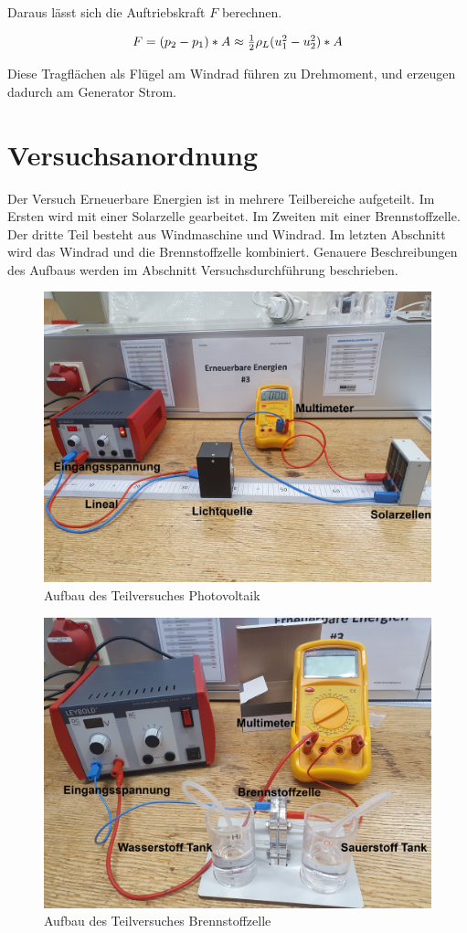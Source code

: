 \documentclass[12pt,a4paper,twoside]{article}
\begin{document}
\noindent
Daraus lässt sich die Auftriebskraft $F$ berechnen. 

\begin{equation}
    \label{eq:auftriebskraft}
    \centerline{$F = (p_2 - p_1) * A \approx \frac{1}{2} \rho_L (u_1^2 - u_2^2)*A $}
\end{equation}

\noindent
Diese Tragflächen als Flügel am Windrad führen zu Drehmoment, und erzeugen dadurch am Generator Strom. 


\section{Versuchsanordnung} %
Der Versuch Erneuerbare Energien ist in mehrere Teilbereiche aufgeteilt. Im Ersten wird mit einer Solarzelle gearbeitet. Im Zweiten mit einer Brennstoffzelle. Der dritte Teil besteht aus Windmaschine und Windrad. 
Im letzten Abschnitt wird das Windrad und die Brennstoffzelle kombiniert. Genauere Beschreibungen des Aufbaus werden im Abschnitt Versuchsdurchführung beschrieben.

    \begin{figure}[H]
        \centering
        \includegraphics[width=0.6\linewidth]{nudes/solarzelle aufbau.jpg}
        \caption{Aufbau des Teilversuches Photovoltaik}
        \label{fig:aufbau Photovoltaik}
    \end{figure}

    \begin{figure}[H]
        \centering
        \includegraphics[width=0.6\linewidth]{nudes/brennstoff aufbau.jpg}
        \caption{Aufbau des Teilversuches Brennstoffzelle}
        \label{fig:aufbau Brennstoffzelle}
    \end{figure}
\end{document}
